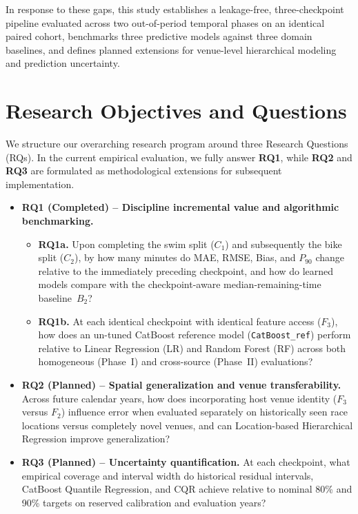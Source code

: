 \documentclass[11pt,a4paper]{article}
\begin{document}
In response to these gaps, this study establishes a leakage-free,
three-checkpoint pipeline evaluated across two out-of-period temporal
phases on an identical paired cohort, benchmarks three predictive
models against three domain baselines, and defines planned extensions
for venue-level hierarchical modeling and prediction uncertainty.

\section{Research Objectives and Questions}

We structure our overarching research program around three Research
Questions (RQs). In the current empirical evaluation, we fully answer
\textbf{RQ1}, while \textbf{RQ2} and \textbf{RQ3} are formulated as
methodological extensions for subsequent implementation.

\begin{itemize}[leftmargin=*]
  \item \textbf{RQ1 (Completed) -- Discipline incremental value and
  algorithmic benchmarking.}
  \begin{itemize}
    \item \textbf{RQ1a.} Upon completing the swim split ($C_1$) and
    subsequently the bike split ($C_2$), by how many minutes do MAE,
    RMSE, Bias, and $P_{90}$ change relative to the immediately
    preceding checkpoint, and how do learned models compare with the
    checkpoint-aware median-remaining-time baseline~$B_2$?
    \item \textbf{RQ1b.} At each identical checkpoint with identical
    feature access ($F_3$), how does an un-tuned CatBoost reference
    model (\texttt{CatBoost\_ref}) perform relative to Linear
    Regression (LR) and Random Forest (RF) across both homogeneous
    (Phase~I) and cross-source (Phase~II) evaluations?
  \end{itemize}

  \item \textbf{RQ2 (Planned) -- Spatial generalization and venue
  transferability.} Across future calendar years, how does
  incorporating host venue identity ($F_3$ versus $F_2$) influence
  error when evaluated separately on historically seen race locations
  versus completely novel venues, and can Location-based Hierarchical
  Regression improve generalization?

  \item \textbf{RQ3 (Planned) -- Uncertainty quantification.} At each
  checkpoint, what empirical coverage and interval width do historical
  residual intervals, CatBoost Quantile Regression, and CQR achieve
  relative to nominal 80\% and 90\% targets on reserved calibration
  and evaluation years?
\end{itemize}
\end{document}

